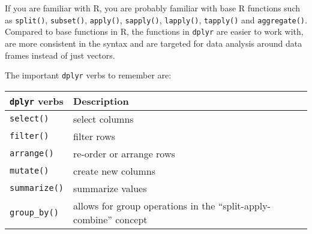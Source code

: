 \documentclass[]{article}
\begin{document}
If you are familiar with R, you are probably familiar with base R
functions such as \texttt{split()}, \texttt{subset()}, \texttt{apply()},
\texttt{sapply()}, \texttt{lapply()}, \texttt{tapply()} and
\texttt{aggregate()}. Compared to base functions in R, the functions in
\texttt{dplyr} are easier to work with, are more consistent in the
syntax and are targeted for data analysis around data frames instead of
just vectors.

The important \texttt{dplyr} verbs to remember are:

\begin{longtable}[]{@{}ll@{}}
\toprule
\begin{minipage}[b]{0.03\columnwidth}\raggedright
\texttt{dplyr} verbs\strut
\end{minipage} & \begin{minipage}[b]{0.91\columnwidth}\raggedright
Description\strut
\end{minipage}\tabularnewline
\midrule
\endhead
\begin{minipage}[t]{0.03\columnwidth}\raggedright
\texttt{select()}\strut
\end{minipage} & \begin{minipage}[t]{0.91\columnwidth}\raggedright
select columns\strut
\end{minipage}\tabularnewline
\begin{minipage}[t]{0.03\columnwidth}\raggedright
\texttt{filter()}\strut
\end{minipage} & \begin{minipage}[t]{0.91\columnwidth}\raggedright
filter rows\strut
\end{minipage}\tabularnewline
\begin{minipage}[t]{0.03\columnwidth}\raggedright
\texttt{arrange()}\strut
\end{minipage} & \begin{minipage}[t]{0.91\columnwidth}\raggedright
re-order or arrange rows\strut
\end{minipage}\tabularnewline
\begin{minipage}[t]{0.03\columnwidth}\raggedright
\texttt{mutate()}\strut
\end{minipage} & \begin{minipage}[t]{0.91\columnwidth}\raggedright
create new columns\strut
\end{minipage}\tabularnewline
\begin{minipage}[t]{0.03\columnwidth}\raggedright
\texttt{summarize()}\strut
\end{minipage} & \begin{minipage}[t]{0.91\columnwidth}\raggedright
summarize values\strut
\end{minipage}\tabularnewline
\begin{minipage}[t]{0.03\columnwidth}\raggedright
\texttt{group\_by()}\strut
\end{minipage} & \begin{minipage}[t]{0.91\columnwidth}\raggedright
allows for group operations in the ``split-apply-combine'' concept\strut
\end{minipage}\tabularnewline
\bottomrule
\end{longtable}
\end{document}
